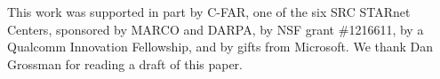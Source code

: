 This work was supported in part by C-FAR, one of the six SRC STARnet Centers,
sponsored by MARCO and DARPA, by NSF grant \#1216611, by a Qualcomm Innovation Fellowship, and by gifts from Microsoft.
We thank Dan Grossman for reading a draft of this paper.
